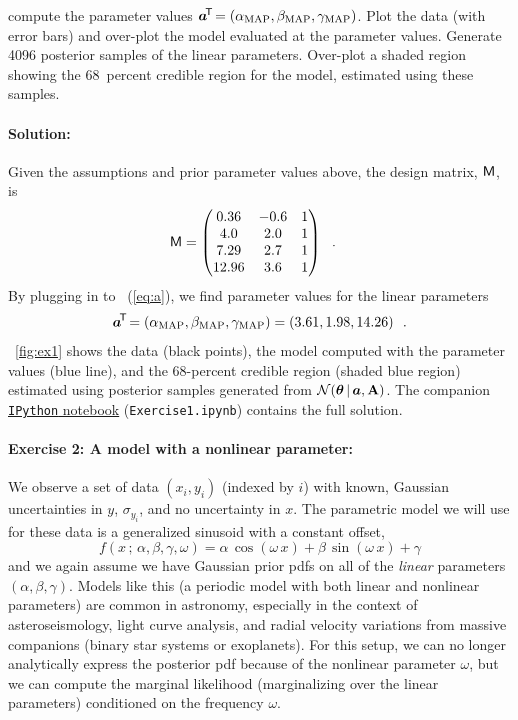 compute the  parameter values $\boldsymbol{a}^{\!\mathsf{T}\!} = (\alpha_{\rm MAP}, \beta_{\rm MAP},
\gamma_{\rm MAP})$.
Plot the data (with error bars) and over-plot the model evaluated at the
 parameter values.
Generate 4096 posterior samples of the linear parameters.
Over-plot a shaded region showing the 68~percent credible region for the model,
estimated using these samples.

\paragraph{Solution:} Given the assumptions and prior parameter values
above, the design matrix, $\mathsf{M}$, is
\begin{align}
  \mathsf{M} &= \begin{pmatrix}
      0.36 & -0.6 & 1\\
      4.0 & 2.0 & 1\\
      7.29 & 2.7 & 1\\
      12.96 & 3.6 & 1
    \end{pmatrix} ~~.
\end{align}
By plugging in to \equationname~(\ref{eq:a}), we find  parameter values for the
linear parameters
\begin{equation}
  \boldsymbol{a}^{\!\mathsf{T}\!} =
    (\alpha_{\rm MAP}, \beta_{\rm MAP}, \gamma_{\rm MAP}) =
      (3.61, 1.98, 14.26) ~~.
\end{equation}
\figurename~\ref{fig:ex1} shows the data (black points), the model computed with
the  parameter values (blue line), and the 68-percent credible region (shaded
blue region) estimated using posterior samples generated from
$\mathcal{N}\!\,(\boldsymbol{\theta}\,|\,\boldsymbol{a},\mathbf{A})$.
The companion \href{https://doi.org/10.5281/zenodo.3855689}{\texttt{IPython}
notebook} (\texttt{Exercise1.ipynb}) contains the full solution.


\paragraph{Exercise 2: A model with a nonlinear parameter:} We
observe a set of data $(x_i, y_i)$ (indexed by $i$) with
known, Gaussian uncertainties in $y$, $\sigma_{y_i}$, and no uncertainty in $x$.
The parametric model we will use for these data is a generalized sinusoid with a
constant offset,
\begin{equation}
  f(x \,;\, \alpha, \beta, \gamma, \omega) =
    \alpha\,\cos(\omega \, x) + \beta\,\sin(\omega \, x) + \gamma \label{eq:ex2model}
\end{equation}
and we again assume we have Gaussian prior pdfs on all of the \emph{linear}
parameters $(\alpha, \beta, \gamma)$.
Models like this (a periodic model with both linear and nonlinear parameters)
are common in astronomy, especially in the context of asteroseismology, light
curve analysis, and radial velocity variations from massive companions (binary
star systems or exoplanets).
For this setup, we can no longer analytically express the posterior pdf because
of the nonlinear parameter $\omega$, but we can compute the marginal likelihood
(marginalizing over the linear parameters) conditioned on the frequency
$\omega$.

